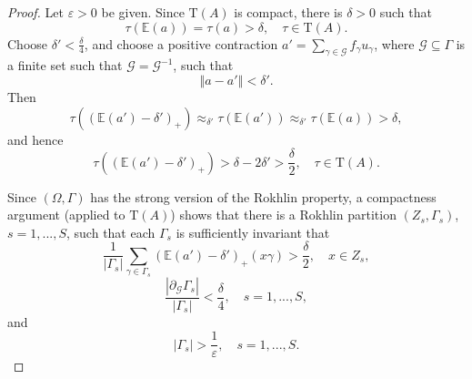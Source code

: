 \documentclass[12pt, oneside, psamsfonts]{amsart}
\theoremstyle{definition}
\theoremstyle{remark}
\numberwithin{equation}{section}
\newcommand{\norm}[1]{\left\Vert#1\right\Vert}
\newcommand{\abs}[1]{\left\vert#1\right\vert}
\newcommand{\eps}{\varepsilon}
\newcommand{\tr}{\mathrm{T}}
\begin{document}
\begin{proof}
%
Let $\eps>0$ be given. Since $\tr(A)$ is compact, there is $\delta>0$ such that $$\tau(\mathbb E(a)) = \tau(a) > \delta,\quad \tau \in \tr(A). $$ 
Choose $\delta' < \frac{\delta}{4}$, and choose a positive contraction $a' = \sum_{\gamma \in \mathcal G} f_\gamma u_\gamma$, where $\mathcal G \subseteq \Gamma$ is a finite set such that $\mathcal G = \mathcal G^{-1}$, such that 
\begin{equation}\label{alg-approx}
\norm{a - a'} < \delta' . 
\end{equation}
Then 
$$ \tau((\mathbb E(a') - \delta')_+) \approx_{\delta'} \tau(\mathbb E(a')) \approx_{\delta'} \tau(\mathbb E(a)) > \delta,$$
and hence
$$ \tau( (\mathbb E(a') - \delta')_+ ) > \delta - 2\delta' > \frac{\delta}{2}, \quad \tau \in \tr(A).$$

Since $(\Omega, \Gamma)$ has the strong version of the Rokhlin property,  a compactness argument (applied to $\tr(A)$) shows that there is a Rokhlin partition $(Z_s, \Gamma_s)$, $s=1, ..., S$, such that each $\Gamma_s$ is sufficiently invariant that 
\begin{equation}\label{avg-1}
\frac{1}{\abs{\Gamma_s}} \sum_{\gamma\in \Gamma_s} (\mathbb E(a') - \delta')_+(x \gamma) > \frac{\delta}{2}, \quad x\in Z_s,
\end{equation}
\begin{equation}\label{avg-2}
\frac{\abs{\partial_{\mathcal G} \Gamma_s}}{\abs{\Gamma_s}} < \frac{\delta}{4},\quad s=1, ..., S,
\end{equation}
and
\begin{equation}\label{large-G}
\abs{\Gamma_s} > \frac{1}{\eps},\quad s=1, ..., S.
\end{equation}


\end{proof}
\end{document}
